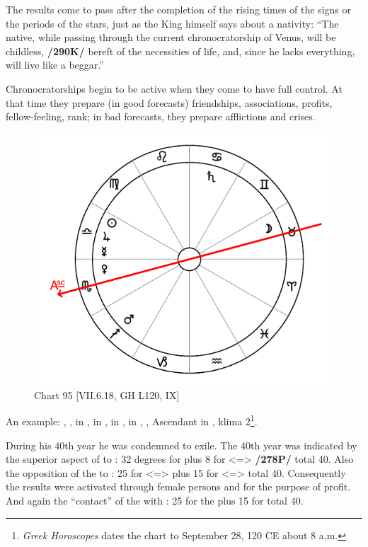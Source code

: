 The \mndl results come to pass after the completion of the rising times of the signs or the periods of the stars, just as the King himself says about a nativity: “The native, while passing through the current
chronocratorship of Venus, will be childless, \textbf{/290K/} bereft of the necessities of life, and, since he lacks everything, will live like a beggar.” 

Chronocratorships begin to be active when they come to have full
control. At that time they prepare (in good forecasts) friendships, associations, profits, fellow-feeling, rank; in bad forecasts, they prepare afflictions and crises.

\newpage
\begin{figure}
\centering
\vspace{0pt}
\includegraphics[width=.68\textwidth]{charts/7_6_18}
\caption{Chart 95 [VII.6.18, GH L120, IX] }
\label{fig:chart95}
\end{figure} 

An example: \Sun, \Jupiter, \Mercury\xspace in \Libra, \Moon\xspace in \Taurus, \Saturn\xspace in \Cancer, \Mars\xspace in \Sagittarius,
\Venus, Ascendant in \Scorpio, klima 2\footnote{\textit{Greek Horoscopes} dates the chart to September 28, 120 CE about 8 a.m.}.

During his 40th year he was condemned to exile. The 40th year
was indicated by the superior aspect of \Saturn\xspace to \Libra: 32 degrees for \Cancer\xspace plus 8 for \Libra\xspace <=\Venus>
\textbf{/278P/} total 40. Also the opposition of the \Moon\xspace to \Venus\xspace <was operative>: 25 for \Taurus\xspace <=\Moon> plus 15 for \Scorpio\xspace <=\Mars> total 40. Consequently the results were activated through female persons and
for the purpose of profit. And again the “contact” of the \Moon\xspace with \Mars\xspace <was operative>: 25 for the \Moon\xspace plus 15 for \Mars\xspace total 40.

